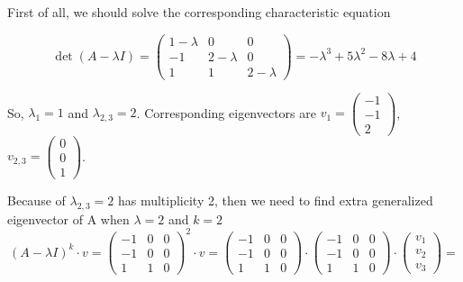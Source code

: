 \documentclass[12pt]{article}
\begin{document}
    First of all, we should solve the corresponding
    characteristic equation

    $$
        \det (A - \lambda I) = 
        \begin{pmatrix}
            1-\lambda & 0 & 0\\
            -1 & 2-\lambda & 0\\
            1 & 1 & 2-\lambda
        \end{pmatrix} =
        -\lambda^3+5\lambda^2-8\lambda+4
    $$

    So, $\lambda_1 = 1$ and $\lambda_{2,3} = 2$. 
    Corresponding eigenvectors are 
    $   v_1 = 
        \begin{pmatrix}
            -1\\
            -1\\
            2
        \end{pmatrix}
    $, 
    $
        v_{2,3} = 
        \begin{pmatrix}
            0\\
            0\\
            1        
        \end{pmatrix}
    $. 
    
    Because of $\lambda_{2,3}=2$ has multiplicity
    2, then we need to find extra generalized
    eigenvector of A when $\lambda=2$ and $k=2$
    $$
        (A-\lambda I)^k\cdot v=
        \begin{pmatrix}
            -1 & 0 & 0\\
            -1 & 0 & 0\\
            1 & 1 & 0
        \end{pmatrix}^2\cdot v=
        \begin{pmatrix}
            -1 & 0 & 0\\
            -1 & 0 & 0\\
            1 & 1 & 0
        \end{pmatrix}\cdot
        \begin{pmatrix}
            -1 & 0 & 0\\
            -1 & 0 & 0\\
            1 & 1 & 0
        \end{pmatrix}\cdot
        \begin{pmatrix}
            v_1\\
            v_2\\
            v_3 
        \end{pmatrix}=
    $$
\end{document}
